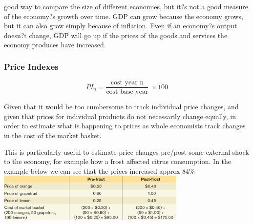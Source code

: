 \documentclass[english,course,draft]{Notes}
\begin{document}
\par{good way to compare the size of
different economies, but it?s not a good measure of the economy?s growth over
time. GDP can grow because the economy grows, but it can also grow simply
because of inflation. Even if an economy?s output doesn?t change, GDP will go
up if the prices of the goods and services the economy produces have increased.}





\subsubsection{Price Indexes}




$$PI_{n} = \frac{\text{cost year n}}{\text{cost base year}} \ \times 100$$

\par{Given that it would be too cumbersome to track individual price changes, and given that prices for individual products do not necessarily change equally, in order to estimate what is happening to prices as whole economists track changes in the cost of the market basket.}
\par{This is particularly useful to estimate price changes pre/post some external shock to the economy, for example how a frost affected citrus consumption. In the example below we can see that the prices increased approx $84\%$} 
\includegraphics[width=0.7\textwidth]{CPI}
\end{document}
